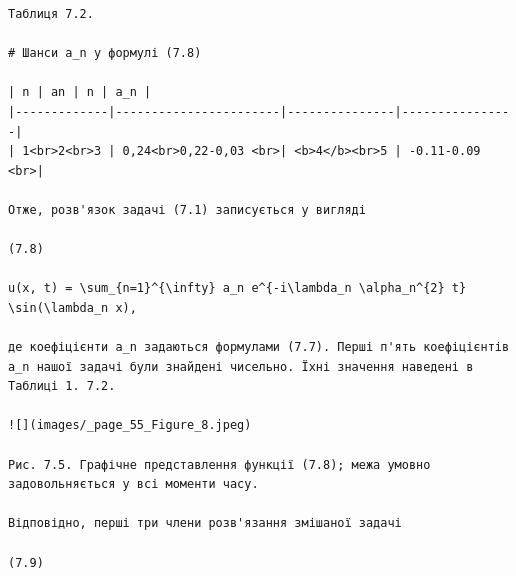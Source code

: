 \documentclass[
  ukrainian,
]{article}
\begin{document}
\begin{verbatim}
Таблиця 7.2.

# Шанси a_n у формулі (7.8)

| n | an | n | a_n |
|-------------|-----------------------|---------------|----------------|
| 1<br>2<br>3 | 0,24<br>0,22-0,03 <br>| <b>4</b><br>5 | -0.11-0.09 <br>|

Отже, розв'язок задачі (7.1) записується у вигляді

(7.8)

u(x, t) = \sum_{n=1}^{\infty} a_n e^{-i\lambda_n \alpha_n^{2} t} \sin(\lambda_n x),

де коефіцієнти a_n задаються формулами (7.7). Перші п'ять коефіцієнтів a_n нашої задачі були знайдені чисельно. Їхні значення наведені в Таблиці 1. 7.2.

![](images/_page_55_Figure_8.jpeg)

Рис. 7.5. Графічне представлення функції (7.8); межа умовно задовольняється у всі моменти часу.

Відповідно, перші три члени розв'язання змішаної задачі

(7.9)


\end{verbatim}
\end{document}
